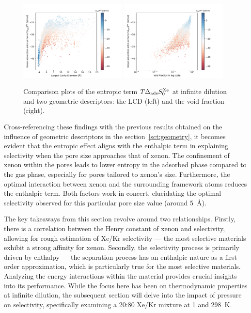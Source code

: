 \documentclass[main.tex]{subfiles}
\begin{document}
\begin{figure}[ht]
  \centering
  \includegraphics[width=0.48\textwidth]{figures/2-thermo/Scatterplot_entropy_lcd.pdf}
  \hfill
  \includegraphics[width=0.48\textwidth]{figures/2-thermo/Scatterplot_entropy_vf.pdf}
  \caption{Comparison plots of the entropic term $T\Delta_{\text{ads}}S^{\text{Xe}}_{\text{0}}$ at infinite dilution and two geometric descriptors: the LCD (left) and the void fraction (right).}\label{fgr:entropy_geometry}
\end{figure}

Cross-referencing these findings with the previous results obtained on the influence of geometric descriptors in the section~\ref{sct:geometry}, it becomes evident that the entropic effect aligns with the  enthalpic term in explaining selectivity when the pore size approaches that of xenon. The confinement of xenon within the pores leads to lower entropy in the adsorbed phase compared to the gas phase, especially for pores tailored to xenon's size. Furthermore, the optimal interaction between xenon and the surrounding framework atoms reduces the enthalpic term. Both factors work in concert, elucidating the optimal selectivity observed for this particular pore size value (around \SI{5}{\angstrom}). 

The key takeaways from this section revolve around two relationships. Firstly, there is a correlation between the Henry constant of xenon and selectivity, allowing for rough estimation of Xe/Kr selectivity --- the most selective materials exhibit a strong affinity for xenon. Secondly, the selectivity process is primarily driven by enthalpy --- the separation process has an enthalpic nature as a first-order approximation, which is particularly true for the most selective materials. Analyzing the energy interactions within the material provides crucial insights into its performance. While the focus here has been on thermodynamic properties at infinite dilution, the subsequent section will delve into the impact of pressure on selectivity, specifically examining a 20:80 Xe/Kr mixture at \SI{1}{\atm} and \SI{298}{\kelvin}. 
\end{document}
